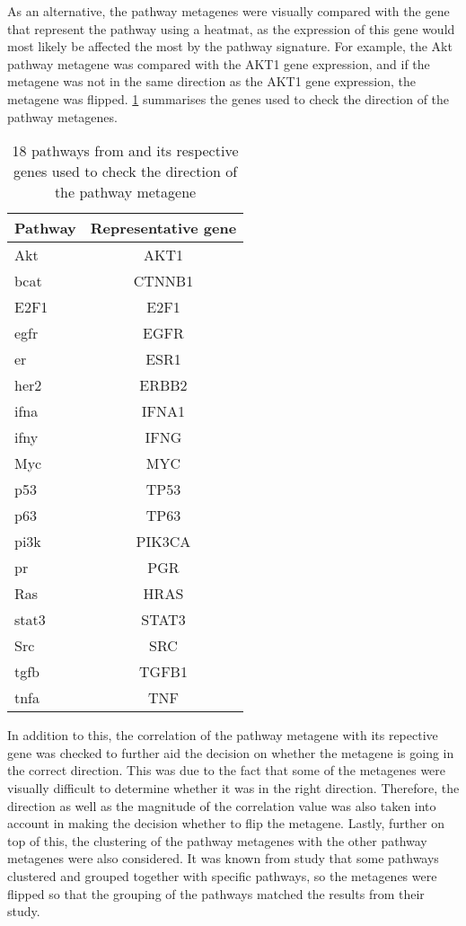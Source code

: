 As an alternative, the pathway metagenes were visually compared with the gene that represent the pathway using a heatmat, as the expression of this gene would most likely be affected the most by the pathway signature.
For example, the Akt pathway metagene was compared with the AKT1 gene expression, and if the metagene was not in the same direction as the AKT1 gene expression, the metagene was flipped.
\cref{tab:metagene_direction} summarises the genes used to check the direction of the pathway metagenes.
\begin{table}[htb]
	\caption{18 pathways from \citet{Gatza2010a} and its respective genes used to check the direction of the pathway metagene}
	\label{tab:metagene_direction}
	\begin{center}
		\begin{tabular}{lc}
			Pathway & Representative gene\\
			\hline
			\rule{0pt}{2.25ex}Akt & AKT1\\
			\gls{bcat}            & CTNNB1\\
			E2F1                  & E2F1\\
			\gls{egfr}            & EGFR\\
			\gls{er}              & ESR1\\
			\gls{her2}            & ERBB2\\
			\gls{ifna}            & IFNA1\\
			\gls{ifny}            & IFNG\\
			Myc                   & MYC\\
			p53                   & TP53\\
			p63                   & TP63\\
			\gls{pi3k}            & PIK3CA\\
			\gls{pr}              & PGR\\
			Ras                   & HRAS\\
			\gls{stat3}           & STAT3\\
			Src                   & SRC\\
			\gls{tgfb}            & TGFB1\\
			\gls{tnfa}            & TNF\\
			\hline
			\hline
		\end{tabular}
	\end{center}
\end{table}
In addition to this, the correlation of the pathway metagene with its repective gene was checked to further aid the decision on whether the metagene is going in the correct direction.
This was due to the fact that some of the metagenes were visually difficult to determine whether it was in the right direction.
Therefore, the direction as well as the magnitude of the correlation value was also taken into account in making the decision whether to flip the metagene.
Lastly, further on top of this, the clustering of the pathway metagenes with the other pathway metagenes were also considered.
It was known from \citet{Gatza2010a} study that some pathways clustered and grouped together with specific pathways, so the metagenes were flipped so that the grouping of the pathways matched the results from their study.

